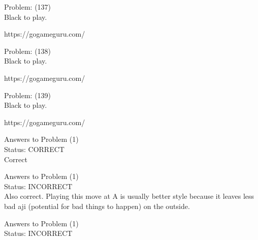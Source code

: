 \documentclass[11pt]{article}
\begin{document}
\begin{minipage}[t]{0.5\textwidth}
  {\centering
  
  Problem: (137)\\
  Black to play.

https://gogameguru.com/\\
  }
\end{minipage}
\begin{minipage}[t]{0.5\textwidth}
  {\centering
  
  Problem: (138)\\
  Black to play.

https://gogameguru.com/\\
  }
\end{minipage}
\begin{minipage}[t]{0.5\textwidth}
  {\centering
  
  Problem: (139)\\
  Black to play.

https://gogameguru.com/\\
  }
\end{minipage}
\begin{minipage}[t]{0.5\textwidth}
  {\centering
  
  Answers to Problem (1)\\
  Status: CORRECT\\
  Correct\\
  }
\end{minipage}
\begin{minipage}[t]{0.5\textwidth}
  {\centering
  
  Answers to Problem (1)\\
  Status: INCORRECT\\
  Also correct. Playing this move at A is usually better style because it leaves less bad aji (potential for bad things to happen) on the outside.\\
  }
\end{minipage}
\begin{minipage}[t]{0.5\textwidth}
  {\centering
  
  Answers to Problem (1)\\
  Status: INCORRECT\\
  
  }
\end{minipage}
\end{document}
